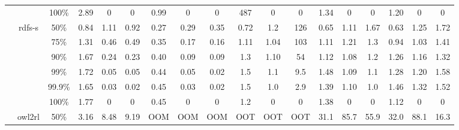 \documentclass[sigconf,screen,review,natbib]{acmart}
\theoremstyle{definition}
\begin{document}
\begin{table*}
\begin{center}
\begin{tabular}{|c|c|c|c|c|c|c|c|c|c|c|c|c|c|c|c|c|c|}
			        &                         & 100\%  & 2.89                      & 0                                      & 0                          & 0.99                                    & 0                        & 0    & 487  & 0    & 0    & 1.34 & 0    & 0    & 1.20 & 0    & 0    \\
			\cline{2-18}
			        & \multirow{6}{*}{rdfs-s} & 50\%   & 0.84                      & 1.11                                   & 0.92                       & 0.27                                    & 0.29                     & 0.35 & 0.72 & 1.2  & 126  & 0.65 & 1.11 & 1.67 & 0.63 & 1.25 & 1.72 \\
			        &                         & 75\%   & 1.31                      & 0.46                                   & 0.49                       & 0.35                                    & 0.17                     & 0.16 & 1.11 & 1.04 & 103  & 1.11 & 1.21 & 1.3  & 0.94 & 1.03 & 1.41 \\
			        &                         & 90\%   & 1.67                      & 0.24                                   & 0.23                       & 0.40                                    & 0.09                     & 0.09 & 1.3  & 1.10 & 54   & 1.12 & 1.08 & 1.2  & 1.26 & 1.16 & 1.32 \\
			        &                         & 99\%   & 1.72                      & 0.05                                   & 0.05                       & 0.44                                    & 0.05                     & 0.02 & 1.5  & 1.1  & 9.5  & 1.48 & 1.09 & 1.1  & 1.28 & 1.20 & 1.58 \\
			        &                         & 99.9\% & 1.65                      & 0.03                                   & 0.02                       & 0.45                                    & 0.03                     & 0.02 & 1.5  & 1.0  & 2.9  & 1.39 & 1.10 & 1.0  & 1.46 & 1.32 & 1.52 \\
			        &                         & 100\%  & 1.77                      & 0                                      & 0                          & 0.45                                    & 0                        & 0    & 1.2  & 0    & 0    & 1.38 & 0    & 0    & 1.12 & 0    & 0    \\
			\cline{2-18}
			        & \multirow{6}{*}{owl2rl} & 50\%   & 3.16                      & 8.48                                   & 9.19                       & OOM                                     & OOM                      & OOM  & OOT  & OOT  & OOT  & 31.1 & 85.7 & 55.9 & 32.0 & 88.1 & 16.3 \\

\end{tabular}
\end{center}
\end{table*}
\end{document}
